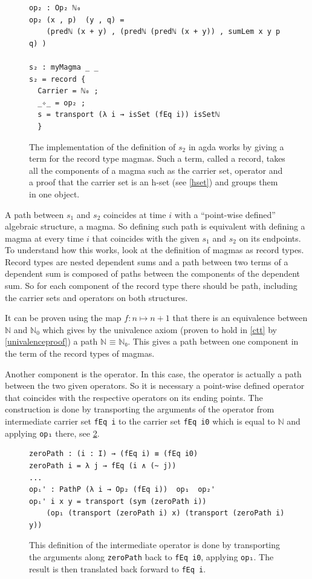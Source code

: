 \documentclass[12pt,a4paper,twoside,xetex]{book}
\begin{document}
\begin{figure}\label{m2def}
 \centering

 
\begin{BVerbatim}
op₂ : Op₂ ℕ₀
op₂ (x , p)  (y , q) = 
    (predℕ (x + y) , (predℕ (predℕ (x + y)) , sumLem x y p q) )

s₂ : myMagma _ _
s₂ = record {
  Carrier = ℕ₀ ;
  _✧_ = op₂ ;
  s = transport (λ i → isSet (fEq i)) isSetℕ
  }
\end{BVerbatim}
 
 \caption{The implementation of the definition of $s_2$ in agda works by giving 
a term for the record type magmas. Such a term, called a record, takes all the 
components of a magma such as the carrier set, operator and a proof that 
the carrier set is an h-set (see \cref{hset}) and groups them in one object.}
\end{figure}



A path between $s_1$ and $s_2$ coincides at time $i$ with a ``point-wise 
defined'' algebraic structure, a magma. So defining such path is equivalent 
with defining a magma at every time $i$ that coincides with the given $s_1$ and 
$s_2$ on its endpoints. To understand how this works, look at the definition of 
magmas as record types. Record types are nested dependent sums and a path 
between two terms of a dependent sum is composed of paths between the 
components of the dependent sum. So for each component of the record type there 
should be path, including the carrier sets and operators on both structures. 

It can be proven using the map $f: n \mapsto n + 1$ that there is an 
equivalence between $\mathbb{N}$ and $\mathbb{N}_0$ which gives by the 
univalence axiom (proven to hold in \cref{ctt} by \cref{univalenceproof}) a 
path $\texttt{ℕ ≡ ℕ₀}$. This gives a path between one component in the term of 
the record types of magmas. 

Another component is the operator. In this case, the operator is actually a 
path between the two given operators. So it is necessary a point-wise defined 
operator that coincides with the respective operators on its ending points. The 
construction is done by transporting the arguments of the operator from 
intermediate carrier set \texttt{fEq i} to the carrier set \texttt{fEq i0} 
which is equal to $\mathbb{N}$ and applying \texttt{op₁} there, see 
\cref{zeroPathLift}.


\begin{figure}\label{zeroPathLift}
\centering 
\begin{BVerbatim}
zeroPath : (i : I) → (fEq i) ≡ (fEq i0)
zeroPath i = λ j → fEq (i ∧ (~ j))
...
opᵢ' : PathP (λ i → Op₂ (fEq i))  op₁  op₂'
opᵢ' i x y = transport (sym (zeroPath i))
    (op₁ (transport (zeroPath i) x) (transport (zeroPath i) y))
\end{BVerbatim}
\caption{This definition of the intermediate operator is done by transporting 
the arguments along \texttt{zeroPath} back to \texttt{fEq i0}, applying 
\texttt{op₁}. The result is then translated back forward to \texttt{fEq i}.}

\end{figure}
\end{document}
